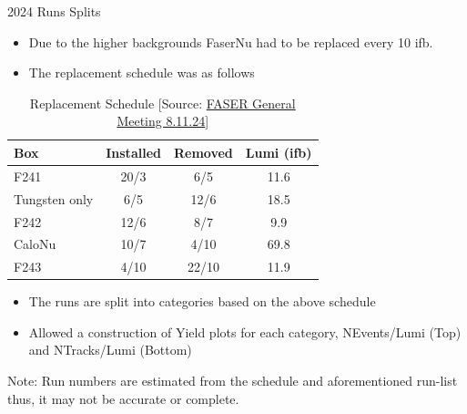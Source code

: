 
\begin{frame}{2024 Runs Splits}
    \begin{itemize}
        \item Due to the higher backgrounds FaserNu had to be replaced every 10 ifb.
        \item The replacement schedule was as follows
    \end{itemize}
    \begin{table}[h!]
        \begin{tabular}{|l|c|c|c|}
            \hline
            \textbf{Box}  & \textbf{Installed} & \textbf{Removed} & \textbf{Lumi (ifb)} \\ \hline
            F241          & 20/3               & 6/5              & 11.6                \\ \hline
            Tungsten only & 6/5                & 12/6             & 18.5                \\ \hline
            F242          & 12/6               & 8/7              & 9.9                 \\ \hline
            CaloNu        & 10/7               & 4/10             & 69.8                \\ \hline
            F243          & 4/10               & 22/10            & 11.9                \\ \hline
        \end{tabular}
        \caption{Replacement Schedule [Source: \href{https://indico.cern.ch/event/1350805/contributions/5686417/attachments/2963344/5212652/FASER-GeneralMtg-8.11.24.pdf}{FASER General Meeting 8.11.24}]}
    \end{table}
    \begin{itemize}
        \item The runs are split into categories based on the above schedule
        \item Allowed a construction of Yield plots for each category, NEvents/Lumi (Top) and NTracks/Lumi (Bottom)
    \end{itemize}
    \scriptsize{Note: Run numbers are estimated from the schedule and aforementioned run-list thus, it may not be accurate or complete.}
\end{frame}

